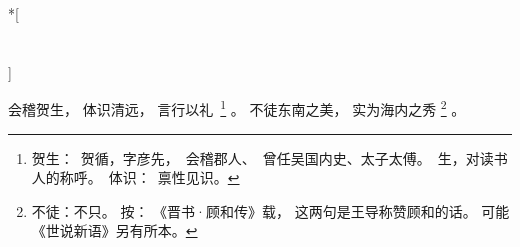 
\switchcolumn[0]*[\section{}]

会稽贺生，
体识清远，
言行以\mbox{礼%
\footnote{%
    贺生：
        贺循，字彦先，
        会稽郡人、
        曾任吴国内史、太子太傅。
        生，对读书人的称呼。
    体识：
        禀性见识。
}}%
。
不徒东南之美，
实为海内之秀%
\footnote{%
    不徒：不只。
    按：
    《晋书·顾和传》载，
    这两句是王导称赞顾和的话。
    可能《世说新语》另有所本。
}%
。

\switchcolumn


